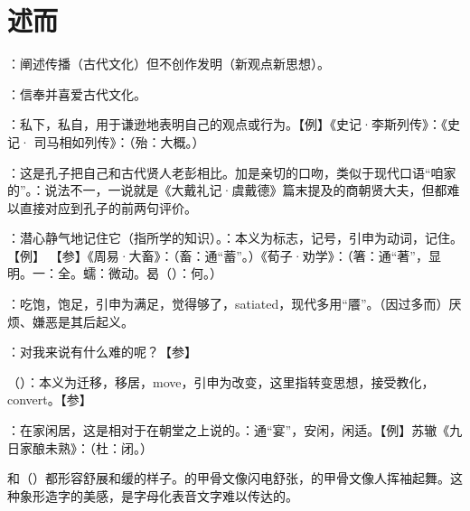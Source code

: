 \chapter{述而}

{
\item {}：阐述传播（古代文化）但不创作发明（新观点新思想）。
\item {}：信奉并喜爱古代文化。
\item {}：私下，私自，用于谦逊地表明自己的观点或行为。【例】《史记·李斯列传》：《史记· 司马相如列传》：（殆：大概。）
\item {}：这是孔子把自己和古代贤人老彭相比。加是亲切的口吻，类似于现代口语“咱家的”。：说法不一，一说就是《大戴礼记·虞戴德》篇末提及的商朝贤大夫，但都难以直接对应到孔子的前两句评价。%
}
{}


{
\item {}：潜心静气地记住它（指所学的知识）。：本义为标志，记号，引申为动词，记住。【例】 【参】《周易·大畜》：（畜：通“蓄”。）《荀子·劝学》：（箸：通“著”，显明。一：全。蠕：微动。曷（）：何。）
\item {}：吃饱，饱足，引申为满足，觉得够了，satiated，现代多用“餍”。（因过多而）厌烦、嫌恶是其后起义。
\item {}：对我来说有什么难的呢？【参】 %
}
{}


{
\item {}（）：本义为迁移，移居，move，引申为改变，这里指转变思想，接受教化，convert。【参】
}
{}


{
\item {}：在家闲居，这是相对于在朝堂之上说的。：通“宴”，安闲，闲适。【例】苏辙《九日家酿未熟》：（杜：闭。） %
\item {}和（）都形容舒展和缓的样子。的甲骨文像闪电舒张，的甲骨文像人挥袖起舞。这种象形造字的美感，是字母化表音文字难以传达的。%
}
{}


